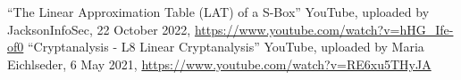 \begin{thebibliography}{9}
	``The Linear Approximation Table (LAT) of a S-Box'' YouTube, uploaded by JacksonInfoSec, 22 October 2022, \url{https://www.youtube.com/watch?v=hHG_Ife-of0}
	``Cryptanalysis - L8 Linear Cryptanalysis'' YouTube, uploaded by Maria Eichlseder, 6 May 2021, \url{https://www.youtube.com/watch?v=RE6xu5THyJA}
\end{thebibliography}